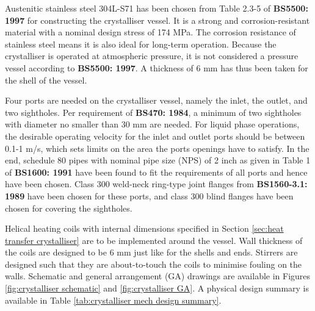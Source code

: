 Austenitic stainless steel 304L-S71 has been chosen from Table 2.3-5 of \textbf{BS5500: 1997} for constructing the crystalliser vessel. It is a strong and corrosion-resistant material with a nominal design stress of 174 MPa. The corrosion resistance of stainless steel means it is also ideal for long-term operation. Because the crystalliser is operated at atmospheric pressure, it is not considered a pressure vessel according to \textbf{BS5500: 1997}. A thickness of 6 mm has thus been taken for the shell of the vessel.

Four ports are needed on the crystalliser vessel, namely the inlet, the outlet, and two sightholes. Per requirement of \textbf{BS470: 1984}, a minimum of two sightholes with diameter no smaller than 30 mm are needed. For liquid phase operations, the desirable operating velocity for the inlet and outlet ports should be between 0.1-1 m/s, which sets limits on the area the ports openings have to satisfy. In the end, schedule 80 pipes with nominal pipe size (NPS) of 2 inch as given in Table 1 of \textbf{BS1600: 1991} have been found to fit the requirements of all ports and hence have been chosen. Class 300 weld-neck ring-type joint flanges from \textbf{BS1560-3.1: 1989} have been chosen for these ports, and class 300 blind flanges have been chosen for covering the sightholes. 


Helical heating coils with internal dimensions specified in Section \ref{sec:heat transfer crystalliser} are to be implemented around the vessel. Wall thickness of the coils are designed to be 6 mm just like for the shells and ends. Stirrers are designed such that they are about-to-touch the coils to minimise fouling on the walls. Schematic and general arrangement (GA) drawings are available in Figures \ref{fig:crystalliser schematic} and \ref{fig:crystalliser GA}. A physical design summary is available in Table \ref{tab:crystalliser mech design summary}. 

